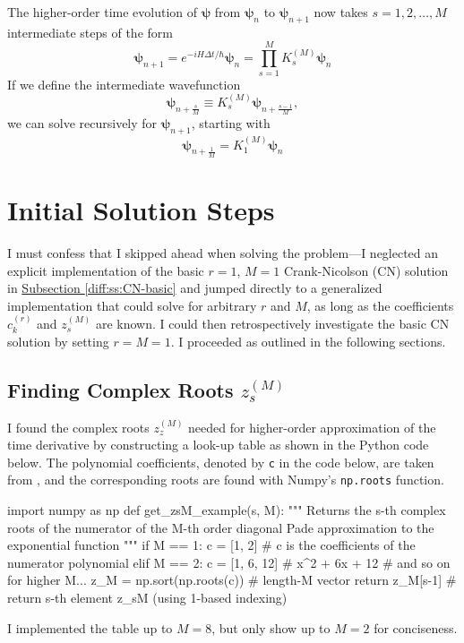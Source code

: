 \documentclass[11pt, a4paper]{article}
\begin{document}
The higher-order time evolution of $ \bm{\psi} $ from $ \bm{\psi}_{n} $ to $ \bm{\psi}_{n+1} $ now takes $ s = 1, 2, \ldots, M $ intermediate steps of the form
\begin{equation}
	\bm{\psi}_{n+1} = e^{-iH\Delta t / \hbar}\bm{\psi}_{n} = \prod_{s=1}^{M}K_{s}^{(M)} \bm{\psi}_{n} \label{diff:eq:psi-higher-M}
\end{equation}
If we define the intermediate wavefunction
\begin{equation*}
	\bm{\psi}_{n+\frac{s}{M}} \equiv K_{s}^{(M)}\bm{\psi}_{n+\frac{s-1}{M}},
\end{equation*}
we can solve recursively for $ \bm{\psi}_{n+1} $, starting with
\begin{equation*}
	\bm{\psi}_{n+\frac{1}{M}} = K_{1}^{(M)} \bm{\psi}_{n}
\end{equation*}



\section{Initial Solution Steps} \label{diff:s:solution}
I must confess that I skipped ahead when solving the problem---I neglected an explicit implementation of the basic $ r = 1 $,  $ M = 1 $ Crank-Nicolson (CN) solution in \hyperref[diff:ss:CN-basic]{Subsection \ref{diff:ss:CN-basic}} and jumped directly to a generalized implementation that could solve for arbitrary $ r $ and $ M $, as long as the coefficients $ c_{k}^{(r)} $ and $ z_{s}^{(M)} $ are known. I could then retrospectively investigate the basic CN solution by setting $ r = M = 1 $. I proceeded as outlined in the following sections.

\subsection{Finding Complex Roots $ z_{s}^{(M)} $}
I found the complex roots $ z_{z}^{(M)} $ needed for higher-order approximation of the time derivative by constructing a look-up table as shown in the Python code below. The polynomial coefficients, denoted by \texttt{c} in the code below, are taken from \cite{oes-exp}, and the corresponding roots are found with Numpy's \texttt{np.roots} function.
\begin{python}
import numpy as np
def get_zsM_example(s, M):
    """ Returns the s-th complex roots of the numerator of the M-th order 
         diagonal Pade approximation to the exponential function """
    if M == 1:
        c = [1, 2]  # c is the coefficients of the numerator polynomial
    elif M == 2:
        c = [1, 6, 12]  # x^2 + 6x + 12
    # and so on for higher M...
    z_M = np.sort(np.roots(c))  # length-M vector
    return z_M[s-1]  # return s-th element z_sM (using 1-based indexing) 
\end{python}
I implemented the table up to $ M = 8 $, but only show up to $ M = 2 $  for conciseness.
\end{document}
